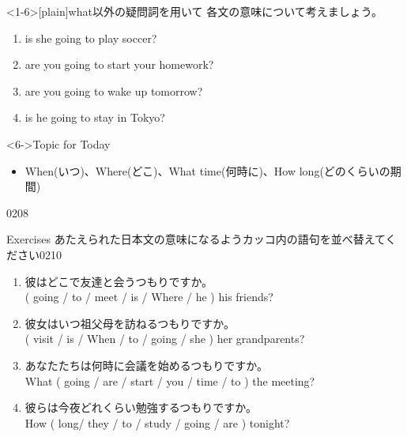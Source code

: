 \documentclass[aspectratio=169,xcolor={dvipsnames,table}]{beamer}
\newcommand{\myaudio}[1]{\href{#1}{\faVolumeUp}}
\begin{document}
\begin{frame}<1-6>[plain]{what以外の疑問詞を用いて}
各文の意味について考えましょう。

\begin{enumerate}
 \item {} is she going to play soccer?
 \item {} are you going to start your homework?
 \item {} are you going to wake up tomorrow?
 \item {} is he going to stay in Tokyo?
\end{enumerate}

\begin{block}<6->{Topic for Today}
\small
\begin{itemize}[square]\small
 \item  When(いつ)、Where(どこ)、What time(何時に)、How long(どのくらいの期間)
\end{itemize}
      \end{block}
\hfill{\tiny 0208}\,{\scriptsize \myaudio{./audio/011_be_going_to_16.mp3}}
\end{frame}
\begin{frame}[plain]{Exercises}
あたえられた日本文の意味になるようカッコ内の語句を並べ替えてください\hfill{\tiny 0210}\,{\scriptsize \myaudio{./audio/011_be_going_to_16.mp3}}

 \begin{enumerate}
  \item 彼はどこで友達と会うつもりですか。\\
( going / to / meet / is / Where / he ) his friends?\\
  \item 彼女はいつ祖父母を訪ねるつもりですか。\\
( visit / is / When / to / going / she ) her grandparents?\\
  \item あなたたちは何時に会議を始めるつもりですか。\\
What ( going / are / start / you / time / to ) the meeting?\\
  \item 彼らは今夜どれくらい勉強するつもりですか。\\
How ( long/ they / to / study / going / are ) tonight?\\
 \end{enumerate}
\end{frame}
\end{document}
